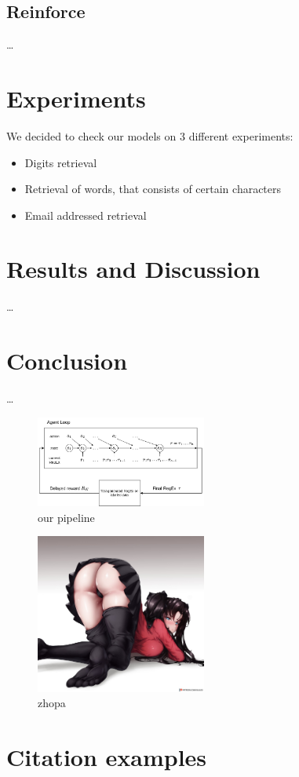 \documentclass{article}
\begin{document}
\subsection{Reinforce}
\dots

\section{Experiments}
We decided to check our models on 3 different experiments:
\begin{itemize}
  \item Digits retrieval
  \item Retrieval of words, that consists of certain characters
  \item Email addressed retrieval
\end{itemize}

\section{Results and Discussion}
\dots

\section{Conclusion}
\dots

\begin{figure}[H]
  \centering
    \includegraphics[width=0.5\textwidth]{./pictures/pipeline.png}
    \caption[our pipeline]{our pipeline}\label{fig:pipeline}
\end{figure}

\begin{figure}[H]
  \centering
    \includegraphics[width=0.5\textwidth]{./pictures/rin.jpg}
    \caption[zhopa]{zhopa}\label{fig:zhopa}
\end{figure}


\section{Citation examples}
\cite{Zhong2018}~\cite{Bartoli2016}~\cite{Bartoli2018}~\cite{Tariq2024}




\end{document}

